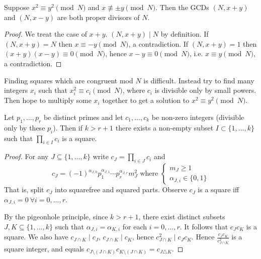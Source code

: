\documentclass{article}
\begin{document}
\begin{nprop}\label{prop:7.7}
    Suppose $x^2 \equiv y^2 \pmod{N}$ and $x \not\equiv \pm y \pmod{N}$.
    Then the GCDs $(N, x+y)$ and $(N, x-y)$ are both proper divisors of $N$.
\end{nprop}

\begin{proof}
    We treat the case of $x+y$. $(N, x+y) \mid N$ by definition.
    If $(N, x+y) = N$ then $x \equiv -y \pmod{N}$, a contradiction.
    If $(N, x+y) = 1$ then $(x+y)(x-y) \equiv 0 \pmod{N}$, hence $x-y \equiv 0 \pmod{N}$, i.e. $x \equiv y \pmod{N}$, a contradiction.
\end{proof}

Finding squares which are congruent mod $N$ is difficult.
Instead try to find many integers $x_i$ such that $x_i^2 \equiv c_i \pmod{N}$, where $c_i$ is divisible only by small powers.
Then hope to multiply some $x_i$ together to get a solution to $x^2 \equiv y^2 \pmod{N}$.

\begin{nlemma}\label{lem:7.8}
    Let $p_1, \dotsc, p_r$ be distinct primes and let $c_1, \dotsc, c_k$ be non-zero integers (divisible only by these $p_i$).
    Then if $k > r+1$ there exists a non-empty subset $I \subset \{1, \dotsc, k\}$ such that $\prod_{i \in I} c_i$ is a square.
\end{nlemma}

\begin{proof}
    For any $J \subseteq \{1, \dotsc, k\}$ write $c_J = \prod_{i \in J} c_i$ and
    \begin{equation*}
        c_J = (-1)^{\alpha_{J, 0}} p_1^{\alpha_{J, 1}} \dotsm p_r^{\alpha_{J, r}} m_J^2 \text{ where }
        \begin{cases}
            m_J \geq 1 \\ \alpha_{J, i} \in \{0, 1\}
        \end{cases}
    \end{equation*}
    That is, split $c_J$ into squarefree and squared parts.
    Observe $c_J$ is a square iff $\alpha_{J, i} = 0 \ \forall i = 0, \dotsc, r$.

    By the pigeonhole principle, since $k > r+1$, there exist distinct subsets $J, K \subseteq \{1, \dotsc, k\}$ such that $\alpha_{J, i} = \alpha_{K, i}$ for each $i = 0, \dotsc, r$.
    It follows that $c_J c_K$ is a square.
    We also have $c_{J \cap K} \mid c_J$, $c_{J \cap K} \mid c_K$, hence $c_{J \cap K}^2 \mid c_J c_K$.
    Hence $\frac{c_J c_K}{c_{J \cap K}^2}$ is a square integer, and equals $c_{J \setminus (J \cap K)} c_{K \setminus (J \cap K)} = c_{J \triangle K}$.
\end{proof}
\end{document}
